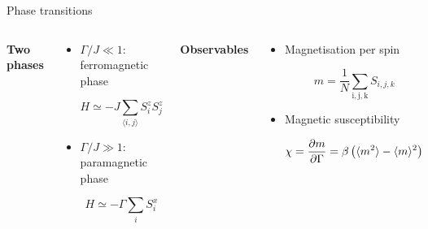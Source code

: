 \documentclass[aspectratio=169, xcolor=dvipsnames]{beamer}
\begin{document}
\begin{frame}{Phase transitions}
	
	\begin{columns}
		
		
		\textbf{Two phases}
		\begin{center}
			
			\begin{itemize}
				
				\item $\Gamma/J \ll 1$: ferromagnetic phase 
				
				\begin{equation*}
					H\simeq-J\sum_{\langle i,j\rangle}S^z_iS^z_j
				\end{equation*}
				
				
				\item $\Gamma/J \gg 1$: paramagnetic phase 
				
				\begin{equation*}
					H\simeq-\Gamma\sum_iS^x_i
				\end{equation*}
				
			\end{itemize}
		\end{center}
		
		
		\textbf{Observables}
		\begin{center}
		
		\begin{itemize}
		
			\item Magnetisation per spin
			
			\begin{equation*}
				m = \frac{1}{N}\sum_\mathrm{i,j,k}S_{i,j,k}
			\end{equation*}
			
			\item Magnetic susceptibility
			
			\begin{equation*}
				\chi = \frac{\partial m}{\partial\Gamma} = \beta\left(\langle m^2\rangle - \langle m\rangle^2\right)
			\end{equation*}
		
		\end{itemize}
		\end{center}

	\end{columns}

\end{frame}
\end{document}

